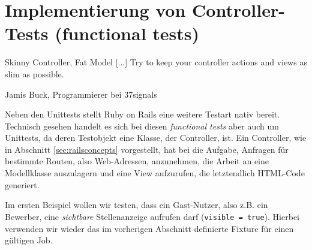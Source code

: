 \section{Implementierung von Controller-Tests (functional tests)}
\epigraph{Skinny Controller, Fat Model [...] Try to keep your controller actions and views as slim as possible.}{Jamis Buck, Programmierer bei 37signals}


Neben den Unittests stellt Ruby on Rails eine weitere Testart nativ bereit. Technisch gesehen handelt es sich bei diesen \textit{functional tests} aber auch um Unittests, da deren Testobjekt eine Klasse, der Controller, ist.
Ein Controller, wie in Abschnitt \ref{sec:railsconcepts} vorgestellt, hat bei  die Aufgabe, Anfragen für bestimmte Routen, also Web-Adressen, anzunehmen, die Arbeit an eine Modellklasse auszulagern und eine View aufzurufen, die letztendlich HTML-Code generiert.

Im ersten Beispiel wollen wir testen, dass ein Gast-Nutzer, also z.B. ein Bewerber, eine \textit{sichtbare} Stellenanzeige aufrufen darf (\texttt{visible = true}). Hierbei verwenden wir wieder das im vorherigen Abschnitt definierte Fixture für einen gültigen Job.

%
%
%
%
\begin{ruby}[label=test/functional/jobs\_controller\_test.rb]
 

   
    
    \PY{o}{[}\PY{o}{]}  
      

        

     
      
\end{ruby}

